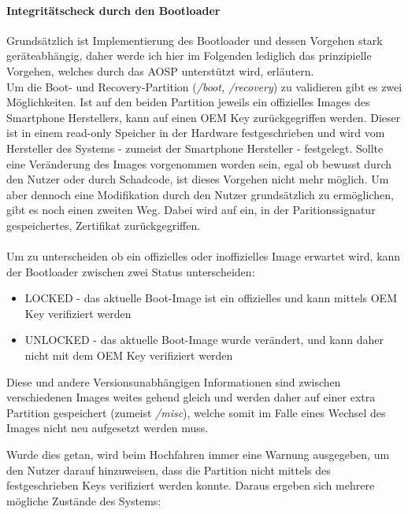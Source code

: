 	\paragraph{Integritätscheck durch den Bootloader}
	Grundsätzlich ist Implementierung des Bootloader und dessen Vorgehen stark geräteabhängig, daher werde ich hier im Folgenden lediglich das prinzipielle Vorgehen, welches durch das AOSP unterstützt wird, erläutern.\\
	Um die Boot- und Recovery-Partition (\textit{/boot, /recovery}) zu validieren gibt es zwei Möglichkeiten. Ist auf den beiden Partition jeweils ein offizielles Images des Smartphone Herstellers, kann auf einen OEM Key zurückgegriffen werden. Dieser ist in einem read-only Speicher in der Hardware festgeschrieben und wird vom Hersteller des Systems - zumeist der Smartphone Hersteller - festgelegt. Sollte eine Veränderung des Images vorgenommen worden sein, egal ob bewusst durch den Nutzer oder durch Schadcode, ist dieses Vorgehen nicht mehr möglich. Um aber dennoch eine Modifikation durch den Nutzer grundsätzlich zu ermöglichen, gibt es noch einen zweiten Weg. Dabei wird auf ein, in der Paritionssignatur gespeichertes, Zertifikat zurückgegriffen.\\\\
	Um zu unterscheiden ob ein offizielles oder inoffizielles Image erwartet wird, kann der Bootloader zwischen zwei Status unterscheiden\cite{VerifiedBoot}:\\
	
	\begin{itemize}\itemsep0pt
		\item LOCKED - das aktuelle Boot-Image ist ein offizielles und kann mittels OEM Key verifiziert werden
		\item UNLOCKED - das aktuelle Boot-Image wurde verändert, und kann daher nicht mit dem OEM Key verifiziert werden
	\end{itemize}
	
\begin{flushleft}
	Diese und andere Versionsunabhängigen Informationen sind zwischen verschiedenen Images weites gehend gleich und werden daher auf einer extra Partition gespeichert (zumeist \textit{/misc}), welche somit im Falle eines Wechsel des Images nicht neu aufgesetzt werden muss.
\end{flushleft}
	 Wurde dies getan, wird beim Hochfahren immer eine Warnung ausgegeben, um den Nutzer darauf hinzuweisen, dass die Partition nicht mittels des festgeschrieben Keys verifiziert werden konnte. Daraus ergeben sich mehrere mögliche Zustände des Systems:\\\\
	
